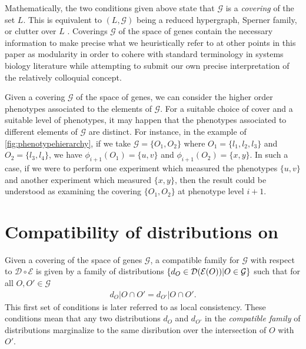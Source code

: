 Mathematically, the two conditions given above state that $\mathcal{G}$ is a \emph{covering} of the set $L$.  This is equivalent to $(L, \mathcal{G})$ being a reduced hypergraph, Sperner family, or clutter over $L$ \cite{Lauritzen1996}.  Coverings $\mathcal{G}$ of the space of genes contain the necessary information to make precise what we heuristically refer to at other points in this paper as modularity in order to cohere with standard terminology in systems biology literature while attempting to submit our own precise interpretation of the relatively colloquial concept.

Given a covering $\mathcal{G}$ of the space of genes, we can consider the higher order phenotypes associated to the elements of $\mathcal{G}$.  For a suitable choice of cover and a suitable level of phenotypes, it may happen that the phenotypes associated to different elements of $\mathcal{G}$ are distinct.  For instance, in the example of \ref{fig:phenotypehierarchy}, if we take $\mathcal{G} = \{O_1, O_2\}$ where $O_1 = \{l_1, l_2, l_3\}$ and $O_2 = \{l_3, l_4\}$, we have $\phi_{i+1}(O_1) = \{u,v\}$ and $\phi_{i+1}(O_2) = \{x,y\}$.  In such a case, if we were to perform one experiment which measured the phenotypes $\{u,v\}$ and another experiment which measured $\{x,y\}$, then the result could be understood as examining the covering $\{O_1, O_2\}$ at phenotype level $i+1$.

\section{Compatibility of distributions on \gnpm{}}\label{sec:compatibilityofgpms}
Given a covering of the space of genes $\mathcal{G}$, a compatible family for $\mathcal{G}$ with respect to $\mathcal{D} \circ \mathcal{E}$ is given by a family of distributions $\{d_O \in \mathcal{D} (\mathcal{E}(O)) | O \in \mathcal{G}\}$ such that for all $O, O' \in \mathcal{G}$
\begin{eqnarray}\label{eq:sheafcond}
d_O|O \cap O' = d_{O'}|O \cap O'.
\end{eqnarray}
This first set of conditions is later referred to as local consistency. These conditions mean that any two distributions $d_O$ and $d_{O'}$ in the \emph{compatible family} of distributions marginalize to the same disribution over the intersection of $O$ with $O'$.

